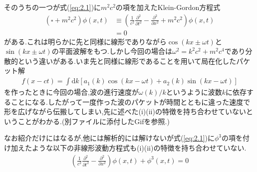 \documentclass[dvipdfmx,11pt,a4paper]{jsbook}
\begin{document}
そのうちの一つが式(\ref{eq:2.1})に$m^2c^2$の項を加えたKlein-Gordon方程式
\begin{align}
    \left(\square+m^{2} c^{2}\right) \phi(x, t) & \equiv\left(\frac{1}{c^{2}} \frac{\partial^{2}}{\partial t^{2}}-\frac{\partial^{2}}{\partial x^{2}}+m^{2} c^{2}\right) \phi(x, t)\nonumber \\
                                                & =0
\end{align}
がある.これは明らかに先と同様に線形でありながら$\cos(kx\pm \omega t)$と$\sin(kx\pm \omega t)$の平面波解をもつ.しかし今回の場合は$\omega^2=k^2c^2+m^2c^4$であり分散的という違いがある.いま先と同様に線形であることを用いて局在化したパケット解
\begin{align*}
    f(x-ct)=\int \mathrm{d} k\left[a_{1}(k) \cos (k x-\omega t)+a_{2}(k) \sin (k x-\omega t)\right]
\end{align*}
を作ったときに今回の場合,波の進行速度が$\omega(k)/k$というように波数$k$に依存することになる.したがって一度作った波のパケットが時間とともに違った速度で形を広げながら伝搬してしまい,先に述べた(i)(ii)の特徴を持ち合わせていないということがわかる.(別ファイルに添付したGifを参照.)
\begin{figure}[H]
    \centering
    \label{wave(spread)}
\end{figure}
なお紹介だけにはなるが,他には解析的には解けないが式(\ref{eq:2.1})に$\phi^3$の項を付け加えたような以下の非線形波動方程式も(i)(ii)の特徴を持ち合わせていない.
\begin{align}
    \left(\frac{1}{c^{2}} \frac{\partial^{2}}{\partial t^{2}}-\frac{\partial^{2}}{\partial x^{2}}\right) \phi(x, t)+\phi^{3}(x, t)=0\label{eq:2.4}
\end{align}
\end{document}
